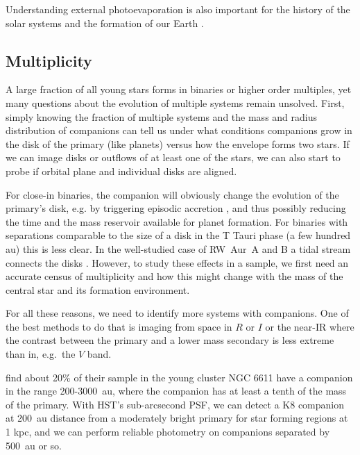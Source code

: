 \documentclass[12pt]{article}
\begin{document}
Understanding external photoevaporation is also important for the history of the solar systems and the formation of our Earth \citep{2015ApJ...815..112K}.

\subsection{Multiplicity}
A large fraction of all young stars forms in binaries or higher order multiples, yet many questions about the evolution of multiple systems remain unsolved. First, simply knowing the fraction of multiple systems and the mass and radius distribution of companions can tell us under what conditions companions grow in the disk of the primary (like planets) versus how the envelope forms two stars. If we can image disks or outflows of at least one of the stars, we can also start to probe if orbital plane and individual disks are aligned.

For close-in binaries, the companion will obviously change the evolution of the primary's disk, e.g. by triggering episodic accretion \citep{2013ApJ...766...62G}, and thus possibly reducing the time and the mass reservoir available for planet formation. For binaries with separations comparable to the size of a disk in the T Tauri phase (a few hundred au) this is less clear. In the well-studied case of RW~Aur~A and B a tidal stream connects the disks \citep{2006A&A...452..897C}. However, to study these effects in a sample, we first need an accurate census of multiplicity and how this might change with the mass of the central star and its formation environment.

For all these reasons, we need to identify more systems with companions. One of
the best methods to do that is imaging from space in $R$ or $I$ or the near-IR where the contrast between the primary and a lower mass secondary is less extreme than in, e.g.\ the $V$ band. 

\citet{2001A&A...379..147D} find about 20\% of their sample in the young
cluster NGC 6611 have a companion in the range 200-3000~au, where the companion
has at least a tenth of the mass of the primary. With HST's sub-arcsecond PSF,
we can detect a K8 companion at 200~au distance from a moderately bright
primary for star forming regions at 1 kpc, and we can perform reliable photometry on companions separated by 500~au or so. 
\end{document}
